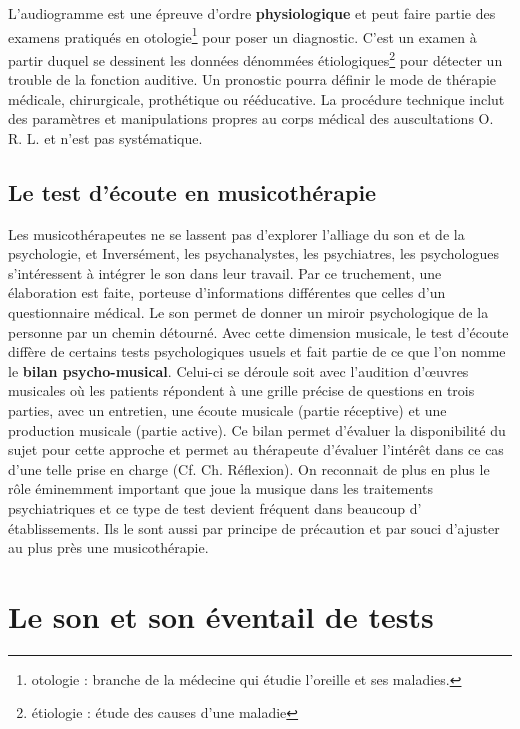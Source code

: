   L'audiogramme est une épreuve d'ordre \textbf{ physiologique} et peut faire partie des examens  pratiqués en otologie\footnote{otologie : branche de la médecine
  	qui étudie l'oreille et ses maladies.} pour poser un diagnostic.
   C'est un examen à partir duquel se
  dessinent les données dénommées étiologiques\footnote{étiologie : étude des causes
  	d'une maladie} pour détecter un trouble de la fonction auditive. Un pronostic pourra définir le mode de thérapie
médicale, chirurgicale, prothétique ou rééducative. La procédure
technique inclut des paramètres et manipulations propres au corps
médical des auscultations O. R. L. et  n'est pas systématique.






\subsection{Le test d'écoute en musicothérapie}

Les musicothérapeutes ne se lassent pas d'explorer l'alliage du son
 et de la psychologie, et Inversément, les psychanalystes, les psychiatres, les psychologues
 s'intéressent à intégrer le son dans leur travail. Par ce truchement,
 une élaboration est faite, porteuse d'informations différentes que
 celles d'un questionnaire médical. Le son permet de donner un miroir
 psychologique de la personne par un chemin détourné. Avec cette dimension
 musicale, le test d'écoute diffère de certains tests psychologiques usuels
 et fait partie de ce que l'on nomme le \textbf{ bilan
   psycho-musical}. Celui-ci se déroule soit avec l'audition d'\oe uvres
 musicales où les patients répondent à une grille précise de questions en trois parties, avec un entretien,
 une écoute musicale (partie réceptive) et une production musicale
 (partie active).
Ce bilan permet d'évaluer la disponibilité du sujet pour cette
approche et permet au thérapeute d'évaluer l'intérêt dans ce cas
d'une telle prise en charge (Cf. Ch. Réflexion).
 On reconnait de plus en plus le rôle éminemment important que joue la musique
 dans les traitements psychiatriques et ce type de test devient
 fréquent dans beaucoup d' établissements. Ils le sont aussi par principe de précaution et
 par souci d'ajuster au plus près une
 musicothérapie.




\section{Le son et son éventail de tests}
\label{musicothEtpsycho}

